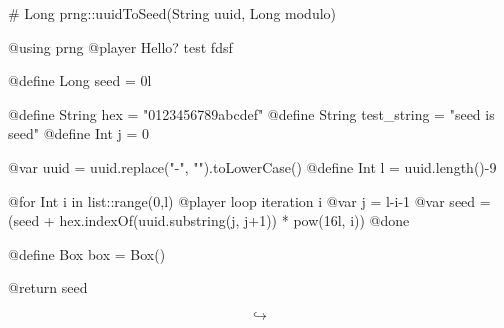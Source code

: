 \documentclass{article}
\begin{document}
    

\begin{msccode}
# Long prng::uuidToSeed(String uuid, Long modulo)

@using prng
@player Hello? test fdsf

@define Long seed = 0l

@define String hex = "0123456789abcdef"
@define String test_string = "seed is {{seed}}"
@define Int j = 0

@var uuid = uuid.replace("-", "").toLowerCase()
@define Int l = uuid.length()-9

@for Int i in list::range(0,l)
    @player loop iteration {{i}}
    @var j = l-i-1
    @var seed = (seed + hex.indexOf(uuid.substring(j, j+1)) * pow(16l, i)) %
@done

@define Box box = Box()

@return seed
\end{msccode}

$$\hookrightarrow$$
\end{document}
